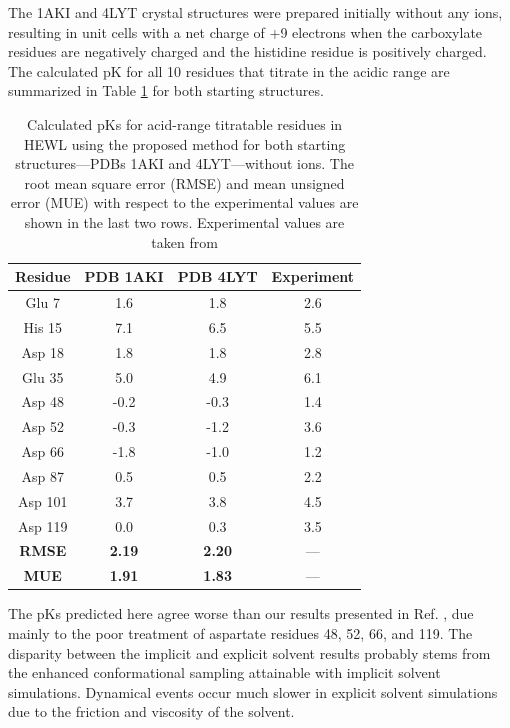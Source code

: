 The 1AKI and 4LYT crystal structures were prepared initially without any ions,
resulting in unit cells with a net charge of +9 electrons when the carboxylate
residues are negatively charged and the histidine residue is positively charged.
The calculated pK for all 10 residues that titrate in the acidic range
are summarized in Table \ref{tbl4:hewl_noions_pkas} for both starting
structures.

\begin{table}
   \caption{Calculated pKs for acid-range titratable residues in HEWL
            using the proposed method for both starting structures---PDBs 1AKI
            and 4LYT---without ions. The root mean square error (RMSE) and mean
            unsigned error (MUE) with respect to the experimental values are
            shown in the last two rows.  Experimental values are taken from
            \citeauthor{Webb_Proteins_2011_v79_p685}
            \cite{Webb_Proteins_2011_v79_p685}}
   \begin{tabular}{cccc}
      Residue & PDB 1AKI & PDB 4LYT & Experiment
                                 \cite{Webb_Proteins_2011_v79_p685} \\
      \hline
      Glu 7 & 1.6 & 1.8 & 2.6 \\
      His 15 & 7.1 & 6.5 & 5.5 \\
      Asp 18 & 1.8 & 1.8 & 2.8 \\
      Glu 35 & 5.0 & 4.9 & 6.1 \\
      Asp 48 & -0.2 & -0.3 & 1.4 \\
      Asp 52 & -0.3 & -1.2 & 3.6 \\
      Asp 66 & -1.8 & -1.0 & 1.2 \\
      Asp 87 & 0.5 & 0.5 & 2.2 \\
      Asp 101 & 3.7 & 3.8 & 4.5 \\
      Asp 119 & 0.0 & 0.3 & 3.5 \\
      \hline
      \hline
      \textbf{RMSE} & \textbf{2.19} & \textbf{2.20} & --- \\
      \textbf{MUE} & \textbf{1.91} & \textbf{1.83} & --- \\
      \hline
   \end{tabular}
   \label{tbl4:hewl_noions_pkas}
\end{table}

The pKs predicted here agree worse than our results presented in Ref.
, due mainly to the poor
treatment of aspartate residues 48, 52, 66, and 119. The disparity between the
implicit and explicit solvent results probably stems from the enhanced
conformational sampling attainable with implicit solvent simulations. Dynamical
events occur much slower in explicit solvent simulations due to the friction and
viscosity of the solvent.

